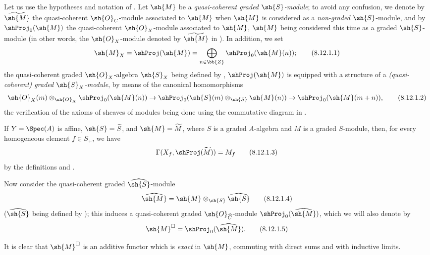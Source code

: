 \begin{env}[8.12.1]
\label{II.8.12.1}
Let us use the hypotheses and notation of .
Let $\sh{M}$ be a \emph{quasi-coherent graded $\sh{S}$-module}; to avoid any confusion, we denote by $\widetilde{\sh{M}}$ the quasi-coherent $\sh{O}_C$-module
associated to $\sh{M}$  when $\sh{M}$ is considered as a \emph{non-graded} $\sh{S}$-module, and by $\shProj_0(\sh{M})$ the quasi-coherent $\sh{O}_X$-module associated to $\sh{M}$, $\sh{M}$ being considered this time as a graded $\sh{S}$-module (in other words, the $\sh{O}_X$-module denoted by $\widetilde{\sh{M}}$ in ).
In addition, we set
\[
\label{II.8.12.1.1}
  \sh{M}_X=\shProj(\sh{M})=\bigoplus_{n\in\bb{Z}}\shProj_0(\sh{M}(n));
\tag{8.12.1.1}
\]
the quasi-coherent graded $\sh{O}_X$-algebra $\sh{S}_X$ being defined by , $\shProj(\sh{M})$ is equipped with a structure of a \emph{(quasi-coherent) graded $\sh{S}_X$-module}, by means of the canonical homomorphisms 
\[
\label{II.8.12.1.2}
  \sh{O}_X(m)\otimes_{\sh{O}_X}\shProj_0(\sh{M}(n))\to\shProj_0(\sh{S}(m)\otimes_\sh{S}\sh{M}(n))\to\shProj_0(\sh{M}(m+n)),
\tag{8.12.1.2}
\]
the verification of the axioms of sheaves of modules being done using the commutative diagram in .

If $Y=\Spec(A)$ is affine, $\sh{S}=\widetilde{S}$, and $\sh{M}=\widetilde{M}$, where $S$ is a graded $A$-algebra and $M$ is a graded $S$-module, then, for every homogeneous element $f\in S_+$, we have
\[
\label{II.8.12.1.3}
  \Gamma(X_f,\shProj(\widetilde{M}))=M_f
\tag{8.12.1.3}
\]
by the definitions and .

Now consider the quasi-coherent graded $\widehat{\sh{S}}$-module
\[
\label{II.8.12.1.4}
  \widehat{\sh{M}}=\sh{M}\otimes_\sh{S}\widehat{\sh{S}}
\tag{8.12.1.4}
\]
($\widehat{\sh{S}}$ being defined by ); this induces a quasi-coherent graded $\sh{O}_{\widehat{C}}$-module $\shProj_0(\widehat{\sh{M}})$, which we will also denote by
\[
\label{II.8.12.1.5}
  \sh{M}^\square=\shProj_0(\widehat{\sh{M}}).
\tag{8.12.1.5}
\]

It is clear  that $\sh{M}^\square$ is an additive functor which is \emph{exact} in $\sh{M}$, commuting with direct sums and with inductive limits.
\end{env}


